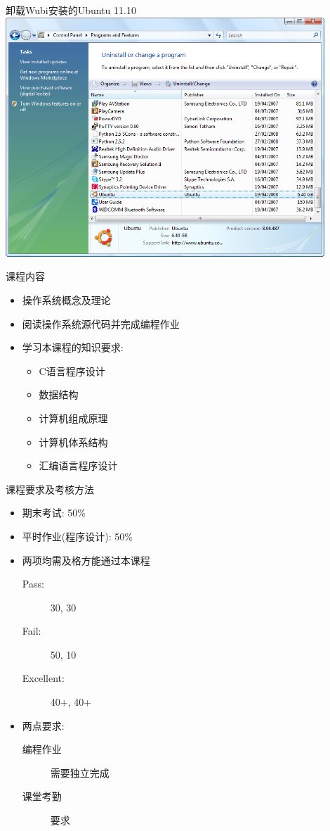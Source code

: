 \documentclass[xcolor=svgnames]{beamer}
\begin{document}
\begin{CJK*}{UTF8}{gbsn}
\begin{frame}{卸载Wubi安装的Ubuntu 11.10}
\includegraphics[width=0.9\textwidth]{uninstall.png}
\end{frame}

\begin{frame}{课程内容}
\begin{itemize}
\item 操作系统概念及理论
\item 阅读操作系统源代码并完成编程作业
\item 学习本课程的知识要求:
\begin{itemize}
\item C语言程序设计
\item 数据结构
\item 计算机组成原理
\item 计算机体系结构
\item 汇编语言程序设计
\end{itemize}
\end{itemize}
\end{frame}

\begin{frame}{课程要求及考核方法}
\begin{itemize}
\item 期末考试: 50\%
\item 平时作业(程序设计): 50\%
\item 两项均需及格方能通过本课程
\begin{description}
\item[Pass:] 30, 30
\item[Fail:] 50, 10
\item[Excellent:] 40+, 40+
\end{description}
\item 两点要求:
\begin{description}
\item[编程作业] 需要独立完成
\item[课堂考勤]要求 
\end{description}
\end{itemize}
\end{frame}


\end{CJK*}
\end{document}
